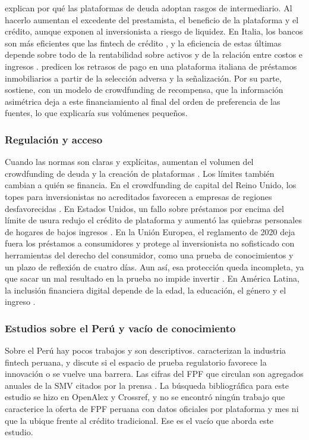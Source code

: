 \textcite{braggion2025} explican por qué las plataformas de deuda adoptan rasgos de intermediario. Al hacerlo aumentan el excedente del prestamista, el beneficio de la plataforma y el crédito, aunque exponen al inversionista a riesgo de liquidez. En Italia, los bancos son más eficientes que las fintech de crédito \parencite{onorato2024}, y la eficiencia de estas últimas depende sobre todo de la rentabilidad sobre activos y de la relación entre costos e ingresos \parencite{pampurini2024}. \textcite{fasano2026} predicen los retrasos de pago en una plataforma italiana de préstamos inmobiliarios a partir de la selección adversa y la señalización. Por su parte, \textcite{miglo2025} sostiene, con un modelo de crowdfunding de recompensa, que la información asimétrica deja a este financiamiento al final del orden de preferencia de las fuentes, lo que explicaría sus volúmenes pequeños.

\subsubsection{Regulación y acceso}

Cuando las normas son claras y explícitas, aumentan el volumen del crowdfunding de deuda y la creación de plataformas \parencite{ran2025}. Los límites también cambian a quién se financia. En el crowdfunding de capital del Reino Unido, los topes para inversionistas no acreditados favorecen a empresas de regiones desfavorecidas \parencite{lazos2025}. En Estados Unidos, un fallo sobre préstamos por encima del límite de usura redujo el crédito de plataforma y aumentó las quiebras personales de hogares de bajos ingresos \parencite{danisewicz2023}. En la Unión Europea, el reglamento de 2020 deja fuera los préstamos a consumidores y protege al inversionista no sofisticado con herramientas del derecho del consumidor, como una prueba de conocimientos y un plazo de reflexión de cuatro días. Aun así, esa protección queda incompleta, ya que sacar un mal resultado en la prueba no impide invertir \parencite{morello2025}. En América Latina, la inclusión financiera digital depende de la edad, la educación, el género y el ingreso \parencite{alvarezfranco2026}.

\subsubsection{Estudios sobre el Perú y vacío de conocimiento}

Sobre el Perú hay pocos trabajos y son descriptivos. \textcite{mejiatrujillo2023} caracterizan la industria fintech peruana, y \textcite{lopezaquise2026} discute si el espacio de prueba regulatorio favorece la innovación o se vuelve una barrera. Las cifras del FPF que circulan son agregados anuales de la SMV citados por la prensa \parencite{ramirez2024,ramirez2026}. La búsqueda bibliográfica para este estudio se hizo en OpenAlex y Crossref, y no se encontró ningún trabajo que caracterice la oferta de FPF peruana con datos oficiales por plataforma y mes ni que la ubique frente al crédito tradicional. Ese es el vacío que aborda este estudio.
